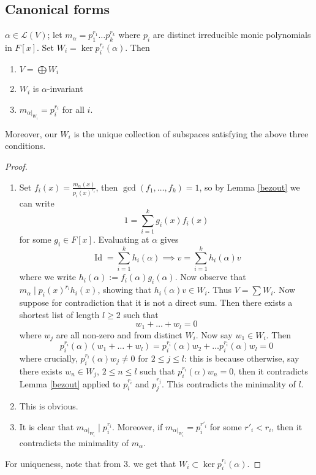 \documentclass{scrartcl}
\def\le{\leqslant}
\def\ge{\geqslant}
\def\L{\mathcal{L}}
\DeclareMathOperator{\id}{Id}
\begin{document}
\subsection{Canonical forms}
\begin{theorem} \label{primary}
	$\alpha \in \L(V)$; let $m_\alpha = p_1^{r_1}\dots p_k^{r_k}$ where $p_i$ are distinct irreducible monic polynomials in $F[x]$. Set $W_i = \ker{p_i^{r_i}(\alpha)}$. Then
	\begin{enumerate}
		\item $V = \bigoplus W_i$
		\item $W_i$ is $\alpha$-invariant
		\item $m_{\alpha\vert_{W_i}} = p_i^{r_i}$ for all $i$.
	\end{enumerate}
	Moreover, our $W_i$ is the unique collection of subspaces satisfying the above three conditions.
\end{theorem} 
\begin{proof}
	\begin{enumerate}
		\item Set $f_i(x) = \frac{m_\alpha(x)}{p_i(x)^{r_i}}$, then $\gcd(f_1, \dots, f_k)=1$, so by Lemma \ref{bezout} we can write
		\[1=\sum_{i=1}^k g_i(x)f_i(x)\]
		for some $g_i \in F[x]$. Evaluating at $\alpha$ gives
		\[\id = \sum_{i=1}^k h_i(\alpha) \implies v = \sum_{i=1}^k h_i(\alpha)v\]
		where we write $h_i(\alpha) := f_i(\alpha)g_i(\alpha)$. Now observe that $m_\alpha \mid p_i(x)^{r_i}h_i(x)$, showing that $h_i(\alpha)v \in W_i$. Thus $V = \sum W_i$. Now suppose for contradiction that it is not a direct sum. Then there exists a shortest list of length $l \ge 2$ such that
		\[w_1 + \dots + w_l = 0\]
		where $w_j$ are all non-zero and from distinct $W_i$. Now say $w_1 \in W_i$. Then 
		\[p_i^{r_i}(\alpha)(w_1 + \dots + w_l) = p_i^{r_i}(\alpha)w_2 + \dots p_i^{r_i}(\alpha)w_l = 0\]
		where crucially, $p_i^{r_i}(\alpha)w_j \ne 0$ for $2 \le j \le l$: this is because otherwise, say there exists $w_n \in W_j$, $2 \le n \le l$ such that $p_i^{r_i}(\alpha)w_n = 0$, then it contradicts Lemma \ref{bezout} applied to $p_i^{r_i}$ and $p_j^{r_j}$. This contradicts the minimality of $l$.
		\item This is obvious.
		\item It is clear that $m_{\alpha\vert_{W_i}} \mid p_i^{r_i}$. Moreover, if $m_{\alpha\vert_{W_i}} = p_i^{r'_i}$ for some $r'_i < r_i$, then it contradicts the minimality of $m_\alpha$. 
	\end{enumerate}	
	For uniqueness, note that from 3. we get that $W_i \subset \ker{p_i^{r_i}}(\alpha)$.
\end{proof}
\end{document}
